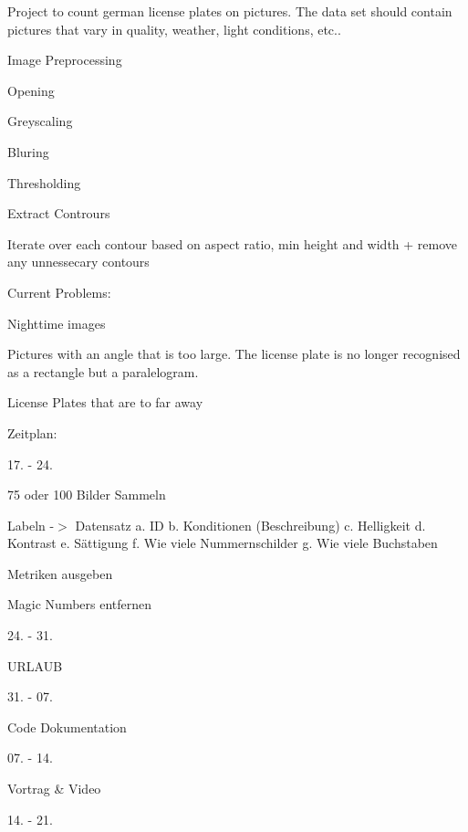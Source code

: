 Project to count german license plates on pictures. The data set should contain pictures that vary in quality, weather, light conditions, etc..


\begin{DoxyEnumerate}
\item Image Preprocessing
\begin{DoxyItemize}
\item Opening
\item Greyscaling
\item Bluring
\item Thresholding
\end{DoxyItemize}
\item Extract Contrours
\item Iterate over each contour based on aspect ratio, min height and width + remove any unnessecary contours
\end{DoxyEnumerate}

Current Problems\+:


\begin{DoxyItemize}
\item Nighttime images
\item Pictures with an angle that is too large. The license plate is no longer recognised as a rectangle but a paralelogram.
\item License Plates that are to far away
\end{DoxyItemize}

Zeitplan\+:

17. -\/ 24.


\begin{DoxyEnumerate}
\item 75 oder 100 Bilder Sammeln
\item Labeln -\/\texorpdfstring{$>$}{>} Datensatz a. ID b. Konditionen (Beschreibung) c. Helligkeit d. Kontrast e. Sättigung f. Wie viele Nummernschilder g. Wie viele Buchstaben
\item Metriken ausgeben
\item Magic Numbers entfernen
\end{DoxyEnumerate}

24. -\/ 31.

URLAUB

31. -\/ 07.

Code Dokumentation

07. -\/ 14.

Vortrag \& Video

14. -\/ 21.

 